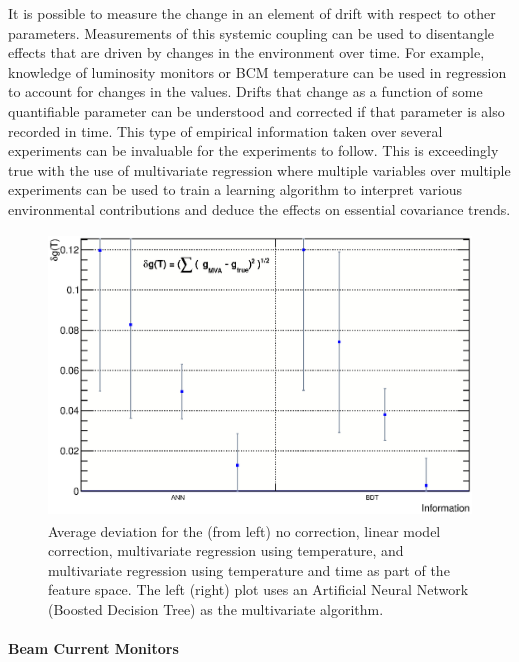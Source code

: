 It is possible to measure the change in an element of drift with respect to other parameters.  Measurements of this systemic coupling
can be used to disentangle effects that are driven by changes in the environment over time.  For example, knowledge of luminosity monitors or BCM temperature
can be used in regression to account for changes in the values.  Drifts that change as a function of some quantifiable parameter can be understood
and corrected if that parameter is also recorded in time.  This type of empirical information taken over several experiments can be invaluable 
for the experiments to follow.  This is exceedingly true with the use of multivariate regression where multiple variables over multiple experiments can be used to train a learning algorithm to interpret various environmental contributions and deduce the effects on essential covariance trends.  %

\begin{figure}
\begin{center}
\includegraphics[height=75mm, angle=0]{./figs/Regression}
\end{center}
\caption{Average deviation for the (from left) no correction, linear model correction, multivariate regression using temperature, and multivariate regression using temperature and time as part of the feature space.  The left (right) plot uses an Artificial Neural Network (Boosted Decision Tree) as the multivariate algorithm.}
\label{regression}
\end{figure}
\fi


\paragraph{ Beam Current Monitors }\mbox{}

